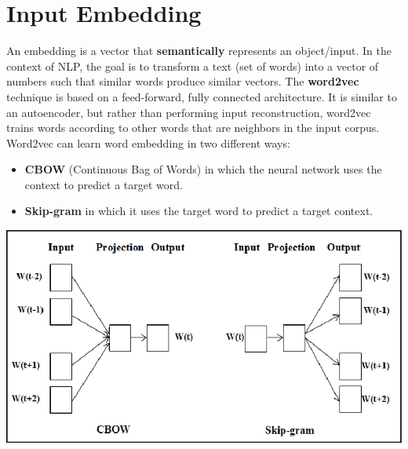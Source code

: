 \section{Input Embedding}
An embedding is a vector that \textbf{semantically} represents an object/input. In the context of NLP, the goal is to transform a text (set of words) into a vector of numbers such that similar words produce similar vectors. The \textbf{word2vec} technique is based on a feed-forward, fully connected architecture. It is similar to an autoencoder, but rather than performing input reconstruction, word2vec trains words according to other words that are neighbors in the input corpus.
\newline\newline
Word2vec can learn word embedding in two different ways:
\begin{itemize}
    \item \textbf{CBOW} (Continuous Bag of Words) in which the neural network uses the context to predict a target word.

    \item \textbf{Skip-gram} in which it uses the target word to predict a target context.
\end{itemize}
\begin{center}
    \includegraphics[scale = 0.4]{images/word2vec.png}
\end{center}


